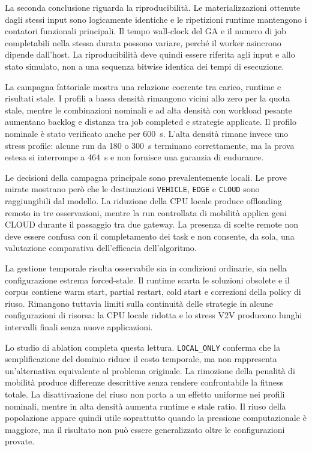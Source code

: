 La seconda conclusione riguarda la riproducibilità. Le materializzazioni ottenute dagli stessi input sono logicamente identiche e le ripetizioni runtime mantengono i contatori funzionali principali. Il tempo wall-clock del GA e il numero di job completabili nella stessa durata possono variare, perché il worker asincrono dipende dall'host. La riproducibilità deve quindi essere riferita agli input e allo stato simulato, non a una sequenza bitwise identica dei tempi di esecuzione.

La campagna fattoriale mostra una relazione coerente tra carico, runtime e risultati stale. I profili a bassa densità rimangono vicini allo zero per la quota stale, mentre le combinazioni nominali e ad alta densità con workload pesante aumentano backlog e distanza tra job completed e strategie applicate. Il profilo nominale è stato verificato anche per 600~s. L'alta densità rimane invece uno stress profile: alcune run da 180 o 300~s terminano correttamente, ma la prova estesa si interrompe a 464~s e non fornisce una garanzia di endurance.

Le decisioni della campagna principale sono prevalentemente locali. Le prove mirate mostrano però che le destinazioni \texttt{VEHICLE}, \texttt{EDGE} e \texttt{CLOUD} sono raggiungibili dal modello. La riduzione della CPU locale produce offloading remoto in tre osservazioni, mentre la run controllata di mobilità applica geni CLOUD durante il passaggio tra due gateway. La presenza di scelte remote non deve essere confusa con il completamento dei task e non consente, da sola, una valutazione comparativa dell'efficacia dell'algoritmo.

La gestione temporale risulta osservabile sia in condizioni ordinarie, sia nella configurazione estrema forced-stale. Il runtime scarta le soluzioni obsolete e il corpus contiene warm start, partial restart, cold start e correzioni della policy di riuso. Rimangono tuttavia limiti sulla continuità delle strategie in alcune configurazioni di risorsa: la CPU locale ridotta e lo stress V2V producono lunghi intervalli finali senza nuove applicazioni.

Lo studio di ablation completa questa lettura. \texttt{LOCAL\_ONLY} conferma che la semplificazione del dominio riduce il costo temporale, ma non rappresenta un'alternativa equivalente al problema originale. La rimozione della penalità di mobilità produce differenze descrittive senza rendere confrontabile la fitness totale. La disattivazione del riuso non porta a un effetto uniforme nei profili nominali, mentre in alta densità aumenta runtime e stale ratio. Il riuso della popolazione appare quindi utile soprattutto quando la pressione computazionale è maggiore, ma il risultato non può essere generalizzato oltre le configurazioni provate.

